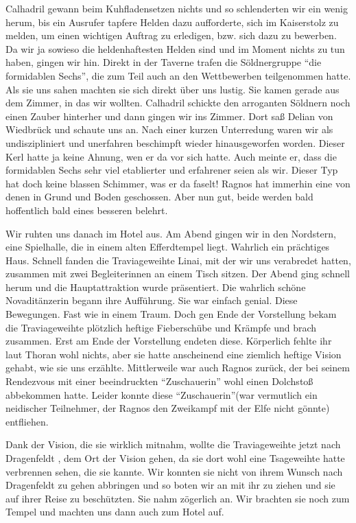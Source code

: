 Calhadril gewann beim Kuhfladensetzen nichts und so schlenderten wir ein wenig herum, bis ein Ausrufer tapfere Helden dazu aufforderte, sich im Kaiserstolz zu melden, um einen wichtigen Auftrag zu erledigen, bzw. sich dazu zu bewerben. Da wir ja sowieso die heldenhaftesten Helden sind und im Moment nichts zu tun haben, gingen wir hin. Direkt in der Taverne trafen die Söldnergruppe ``die formidablen Sechs'', die zum Teil auch an den Wettbewerben teilgenommen hatte. Als sie uns sahen machten sie sich direkt über uns lustig. Sie kamen gerade aus dem Zimmer, in das wir wollten. Calhadril schickte den arroganten Söldnern noch einen Zauber hinterher und dann gingen wir ins Zimmer. Dort saß Delian von Wiedbrück und schaute uns an. Nach einer kurzen Unterredung waren wir als undiszipliniert und unerfahren beschimpft wieder hinausgeworfen worden. Dieser Kerl hatte ja keine Ahnung, wen er da vor sich hatte. Auch meinte er, dass die formidablen Sechs sehr viel etablierter und erfahrener seien als wir. Dieser Typ hat doch keine blassen Schimmer, was er da faselt! Ragnos hat immerhin eine von denen in Grund und Boden geschossen. Aber nun gut, beide werden bald hoffentlich bald eines besseren belehrt. 


Wir ruhten uns danach im Hotel aus. Am Abend gingen wir in den Nordstern, eine Spielhalle, die in einem alten Efferdtempel liegt. Wahrlich ein prächtiges Haus. Schnell fanden die Traviageweihte Linai, mit der wir uns verabredet hatten, zusammen mit zwei Begleiterinnen an einem Tisch sitzen. Der Abend ging schnell herum und die Hauptattraktion wurde präsentiert. Die wahrlich schöne Novaditänzerin begann ihre Aufführung. Sie war einfach genial. Diese Bewegungen. Fast wie in einem Traum. Doch gen Ende der Vorstellung bekam die Traviageweihte plötzlich heftige Fieberschübe und Krämpfe und brach zusammen. Erst am Ende der Vorstellung endeten diese. Körperlich fehlte ihr laut Thoran wohl nichts, aber sie hatte anscheinend eine ziemlich heftige Vision gehabt, wie sie uns erzählte. Mittlerweile war auch Ragnos zurück, der bei seinem Rendezvous mit einer beeindruckten ``Zuschauerin'' wohl einen Dolchstoß abbekommen hatte. Leider konnte diese ``Zuschauerin''(war vermutlich ein neidischer Teilnehmer, der Ragnos den Zweikampf mit der Elfe nicht gönnte) entfliehen. 


Dank der Vision, die sie wirklich mitnahm, wollte die Traviageweihte jetzt nach Dragenfeldt , dem Ort der Vision gehen, da sie dort wohl eine Tsageweihte hatte verbrennen sehen, die sie kannte. Wir konnten sie nicht von ihrem Wunsch nach Dragenfeldt zu gehen abbringen und so boten wir an mit ihr zu ziehen und sie auf ihrer Reise zu beschützten. Sie nahm zögerlich an. Wir brachten sie noch zum Tempel und machten uns dann auch zum Hotel auf.

